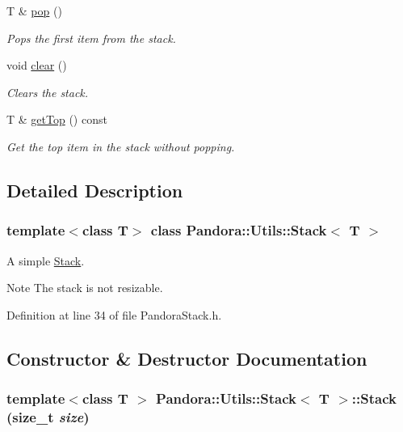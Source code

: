 \begin{DoxyCompactItemize}
T \& \hyperlink{classPandora_1_1Utils_1_1Stack_a2ef38d630c91e48b425799887621433f}{pop} ()
\begin{DoxyCompactList}\small\item\em Pops the first item from the stack. \item\end{DoxyCompactList}\item 
void \hyperlink{classPandora_1_1Utils_1_1Stack_acbedc5107a2e03fe9a53d044efdcbabf}{clear} ()
\begin{DoxyCompactList}\small\item\em Clears the stack. \item\end{DoxyCompactList}\item 
T \& \hyperlink{classPandora_1_1Utils_1_1Stack_a9bdcdee9e004ce12b8dcfc36663d0eac}{getTop} () const 
\begin{DoxyCompactList}\small\item\em Get the top item in the stack without popping. \item\end{DoxyCompactList}\end{DoxyCompactItemize}


\subsection{Detailed Description}
\subsubsection*{template$<$class T$>$ class Pandora::Utils::Stack$<$ T $>$}

A simple \hyperlink{classPandora_1_1Utils_1_1Stack}{Stack}. \begin{DoxyNote}{Note}
The stack is not resizable. 
\end{DoxyNote}


Definition at line 34 of file PandoraStack.h.

\subsection{Constructor \& Destructor Documentation}
\hypertarget{classPandora_1_1Utils_1_1Stack_aeebc274daaf6ba9da141e53dcd818352}{
\subsubsection[{Stack}]{\setlength{\rightskip}{0pt plus 5cm}template$<$class T $>$ {\bf Pandora::Utils::Stack}$<$ T $>$::{\bf Stack} (size\_\-t {\em size})}}
\label{classPandora_1_1Utils_1_1Stack_aeebc274daaf6ba9da141e53dcd818352}


